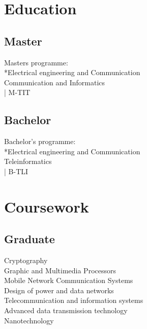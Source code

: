 \documentclass[letterpaper]{deedy-resume.en} %
\begin{document}
\begin{minipage}[t]{0.39\textwidth} %

\section{Education} 

\subsection{Master}
Masters programme: \\*Electrical engineering and Communication
\\Communication and Informatics
\\| M-TIT


\sectionspace %


\subsection{Bachelor}
Bachelor's programme: \\*Electrical engineering and Communication
\\Teleinformatics
\\| B-TLI

\sectionspace %

\section{Coursework}

\subsection{Graduate}

Cryptography \\
Graphic and Multimedia Processors \\
Mobile Network Communication Systems \\
Design of power and data networks \\
Telecommunication and information systems \\
Advanced data transmission technology \\
Nanotechnology


\end{minipage}
\end{document}
